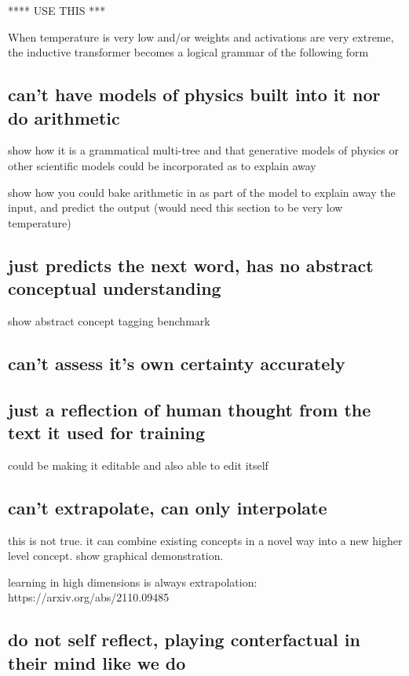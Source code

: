 **** USE THIS ***

When temperature is very low and/or weights and activations are very extreme, the inductive transformer becomes a logical grammar of the following form

\subsection{can't have models of physics built into it nor do arithmetic}

show how it is a grammatical multi-tree and that generative models of physics or other scientific models could be incorporated as to explain away 

show how you could bake arithmetic in as part of the model to explain away the input, and predict the output (would need this section to be very low temperature)

\subsection{just predicts the next word, has no abstract conceptual understanding}

show abstract concept tagging benchmark

\subsection{can't assess it's own certainty accurately}

\subsection{just a reflection of human thought from the text it used for training}

could be making it editable
and also able to edit itself

\subsection{can't extrapolate, can only interpolate}

this is not true.  it can combine existing concepts in a novel way into a new higher level concept.  show graphical demonstration.

learning in high dimensions is always extrapolation:
https://arxiv.org/abs/2110.09485

\subsection{do not self reflect, playing conterfactual in their mind like we do}

